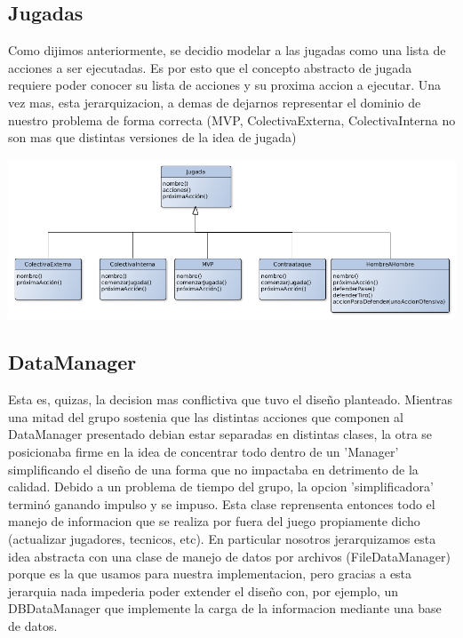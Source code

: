 \subsection{Jugadas}
Como dijimos anteriormente, se decidio modelar a las jugadas como una lista de acciones a ser ejecutadas. Es por esto que el concepto abstracto de jugada requiere poder conocer su lista de acciones y su proxima accion a ejecutar. Una vez mas, esta jerarquizacion, a demas de dejarnos representar el dominio de nuestro problema de forma correcta (MVP, ColectivaExterna, ColectivaInterna no son mas que distintas versiones de la idea de jugada)
\begin{center}
\includegraphics[scale=0.4]{diagramas/jugadas.png}
\end{center}


\subsection{DataManager}
Esta es, quizas, la decision mas conflictiva que tuvo el diseño planteado. Mientras una mitad del grupo sostenia que las distintas acciones que componen al DataManager presentado debian estar separadas en distintas clases, la otra se posicionaba firme en la idea de concentrar todo dentro de un 'Manager' simplificando el diseño de una forma que no impactaba en detrimento de la calidad.
Debido a un problema de tiempo del grupo, la opcion 'simplificadora' terminó ganando impulso y se impuso.
Esta clase reprensenta entonces todo el manejo de informacion que se realiza por fuera del juego propiamente dicho (actualizar jugadores, tecnicos, etc). En particular nosotros jerarquizamos esta idea abstracta con una clase de manejo de datos por archivos (FileDataManager) porque es la que usamos para nuestra implementacion, pero gracias a esta jerarquia nada impederia poder extender el diseño con, por ejemplo, un DBDataManager que implemente la carga de la informacion mediante una base de datos.

